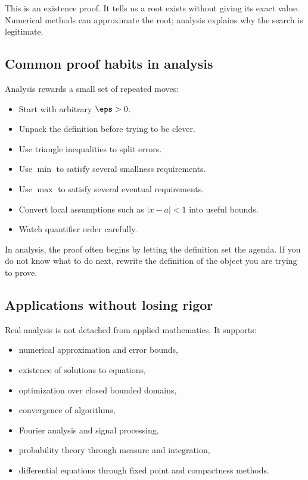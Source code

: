This is an existence proof. It tells us a root exists without giving its exact
value. Numerical methods can approximate the root; analysis explains why the
search is legitimate.

\subsection{Common proof habits in analysis}

Analysis rewards a small set of repeated moves:

\begin{itemize}
\item Start with arbitrary $\eps>0$.
\item Unpack the definition before trying to be clever.
\item Use triangle inequalities to split errors.
\item Use $\min$ to satisfy several smallness requirements.
\item Use $\max$ to satisfy several eventual requirements.
\item Convert local assumptions such as $|x-a|<1$ into useful bounds.
\item Watch quantifier order carefully.
\end{itemize}

\begin{focusbox}
In analysis, the proof often begins by letting the definition set the agenda.
If you do not know what to do next, rewrite the definition of the object you are
trying to prove.
\end{focusbox}

\subsection{Applications without losing rigor}

Real analysis is not detached from applied mathematics. It supports:

\begin{itemize}
\item numerical approximation and error bounds,
\item existence of solutions to equations,
\item optimization over closed bounded domains,
\item convergence of algorithms,
\item Fourier analysis and signal processing,
\item probability theory through measure and integration,
\item differential equations through fixed point and compactness methods.
\end{itemize}

